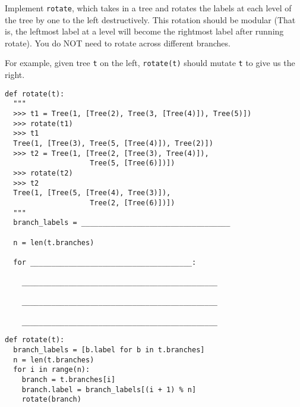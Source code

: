 \begin{blocksection}
\question Implement \texttt{rotate}, which takes in a tree and rotates the labels at each level of the tree by one to the left destructively. This rotation should be modular (That is, the leftmost label at a level will become the rightmost label after running rotate). You do NOT need to rotate across different branches.

For example, given tree \texttt{t} on the left, \texttt{rotate(t)} should mutate \texttt{t} to give us the right.


\begin{lstlisting}
def rotate(t):
  """
  >>> t1 = Tree(1, [Tree(2), Tree(3, [Tree(4)]), Tree(5)])
  >>> rotate(t1)
  >>> t1
  Tree(1, [Tree(3), Tree(5, [Tree(4)]), Tree(2)])
  >>> t2 = Tree(1, [Tree(2, [Tree(3), Tree(4)]), 
                    Tree(5, [Tree(6)])])
  >>> rotate(t2)
  >>> t2
  Tree(1, [Tree(5, [Tree(4), Tree(3)]), 
                    Tree(2, [Tree(6)])])
  """
  branch_labels = ___________________________________

  n = len(t.branches)

  for ______________________________________:

    ______________________________________________

    ______________________________________________
    
    ______________________________________________ 
\end{lstlisting}
\end{blocksection}

\begin{blocksection}
\begin{solution}
\begin{lstlisting}
def rotate(t):
  branch_labels = [b.label for b in t.branches]
  n = len(t.branches)
  for i in range(n):
    branch = t.branches[i]
    branch.label = branch_labels[(i + 1) % n]
    rotate(branch)
\end{lstlisting}
\end{solution}
\end{blocksection}